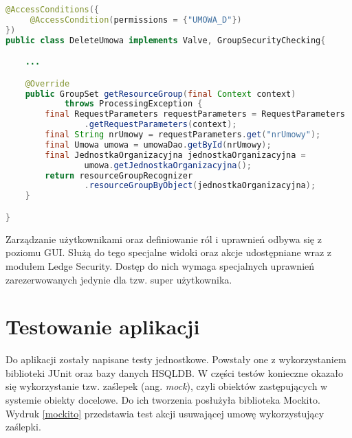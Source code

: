 \begin{lstlisting}[language=Java,style=outcode,showstringspaces=false,caption=Dostęp do akcji usuwającej umowę zabezpieczony za pomocą mechanizmu grup zasobów,label={groupSecurityChecking}]
@AccessConditions({
	 @AccessCondition(permissions = {"UMOWA_D"})
})
public class DeleteUmowa implements Valve, GroupSecurityChecking{

	...

	@Override
	public GroupSet getResourceGroup(final Context context)
			throws ProcessingException {
		final RequestParameters requestParameters = RequestParameters
				.getRequestParameters(context);
		final String nrUmowy = requestParameters.get("nrUmowy");
		final Umowa umowa = umowaDao.getById(nrUmowy);
		final JednostkaOrganizacyjna jednostkaOrganizacyjna =
				umowa.getJednostkaOrganizacyjna();
		return resourceGroupRecognizer
				.resourceGroupByObject(jednostkaOrganizacyjna);
	}

}
\end{lstlisting}

Zarządzanie użytkownikami oraz definiowanie ról i uprawnień odbywa się z poziomu GUI. Służą do tego specjalne widoki oraz akcje udostępniane wraz z modułem Ledge Security. Dostęp do nich wymaga specjalnych uprawnień zarezerwowanych jedynie dla tzw. super użytkownika.

\section[Testowanie aplikacji][Testowanie aplikacji]{Testowanie aplikacji}
Do aplikacji zostały napisane testy jednostkowe. Powstały one z wykorzystaniem biblioteki JUnit oraz bazy danych HSQLDB. W części testów konieczne okazało się wykorzystanie tzw. zaślepek (ang. \textit{mock}), czyli obiektów zastępujących w systemie obiekty docelowe. Do ich tworzenia posłużyła biblioteka Mockito. Wydruk \ref{mockito} przedstawia test akcji usuwającej umowę wykorzystujący zaślepki.

